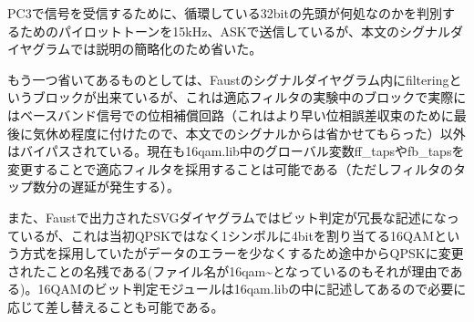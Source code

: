 \documentclass[a4paper]{jsarticle}
\begin{document}
PC3で信号を受信するために、循環している32bitの先頭が何処なのかを判別するためのパイロットトーンを15kHz、ASKで送信しているが、本文のシグナルダイヤグラムでは説明の簡略化のため省いた。

もう一つ省いてあるものとしては、Faustのシグナルダイヤグラム内にfilteringというブロックが出来ているが、これは適応フィルタの実験中のブロックで実際にはベースバンド信号での位相補償回路（これはより早い位相誤差収束のために最後に気休め程度に付けたので、本文でのシグナルからは省かせてもらった）以外はバイパスされている。現在も16qam.lib中のグローバル変数ff\_tapsやfb\_tapsを変更することで適応フィルタを採用することは可能である（ただしフィルタのタップ数分の遅延が発生する）。

また、Faustで出力されたSVGダイヤグラムではビット判定が冗長な記述になっているが、これは当初QPSKではなく1シンボルに4bitを割り当てる16QAMという方式を採用していたがデータのエラーを少なくするため途中からQPSKに変更されたことの名残である(ファイル名が16qam\textasciitilde{}となっているのもそれが理由である)。16QAMのビット判定モジュールは16qam.libの中に記述してあるので必要に応じて差し替えることも可能である。
\end{document}
